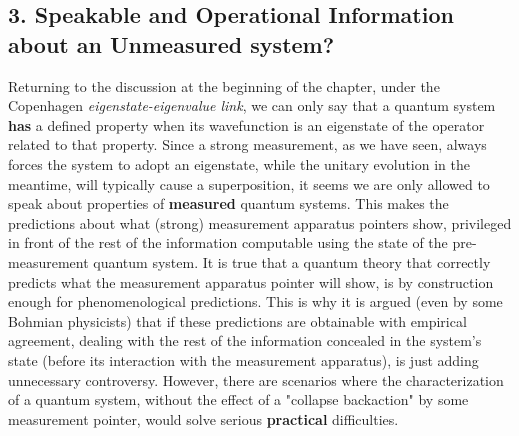 \documentclass[11pt, a4paper]{article} %
\begin{document}
\subsection*{3. Speakable and Operational Information about an Unmeasured system?}
\vspace{-0.18cm}
Returning to the discussion at the beginning of the chapter, under the Copenhagen {\em eigenstate-eigenvalue link}, we can only say that a quantum system {\bf has} a defined property when its wavefunction is an eigenstate of the operator related to that property. Since a strong measurement, as we have seen, always forces the system to adopt an eigenstate, while the unitary evolution in the meantime, will typically cause a superposition, it seems we are only allowed to speak about properties of {\bf measured} quantum systems. This makes the predictions about what (strong) measurement apparatus pointers show, privileged in front of the rest of the information computable using the state of the pre-measurement quantum system. It is true that a quantum theory that correctly predicts what the measurement apparatus pointer will show, is by construction enough for phenomenological predictions. This is why it is argued (even by some Bohmian physicists) that if these predictions are obtainable with empirical agreement, dealing with the rest of the information concealed in the system's state (before its interaction with the measurement apparatus), is just adding unnecessary controversy. However, there are scenarios where the characterization of a quantum system, without the effect of a "collapse backaction" by some measurement pointer, would solve serious {\bf practical} difficulties.\vspace{-0.1cm}
\end{document}
